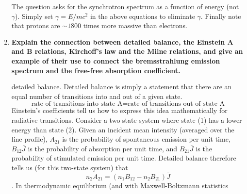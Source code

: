 \begin{enumerate}
      The question asks for the synchrotron spectrum as a function of energy (not $\gamma$).
      Simply set $\gamma = E/mc^2$ in the above equations to eliminate $\gamma$.  Finally note
      that protons are $\sim 1800$ times more massive than electrons.

\item \textbf{Explain the connection between detailed balance, the Einstein A and B relations,
      Kirchoff's law and the Milne relations, and give an example of their use to connect the
      bremsstrahlung emission spectrum and the free-free absorption coefficient.}
      
       detailed balance.  Detailed balance is simply a statement that there are an equal number of transitions
      into and out of a given state.
      \begin{dmath}
        \text{rate of transitions into state A} = \text{rate of transitions out of state A}
      \end{dmath}
      Einstein's coefficients tell us how to express this idea mathematically
      for radiative transitions.
      Consider a two state system where state (1) has a lower energy than state (2).
      Given an incident mean intensity (averaged over the line profile),
      $A_{21}$ is the probability of spontaneous emission per unit time,
      $B_{12}\bar J$ is the probability of absorption per unit time, and
      $B_{21}\bar J$ is the probability of stimulated emission per unit time.
      Detailed balance therefore tells us (for this two-state system) that
      \begin{dmath}\label{eq:detailed_balance}
        n_2A_{21} = (n_1B_{12}-n_2B_{21})\bar J
      \end{dmath}.
      In thermodynamic equilibrium (and with Maxwell-Boltzmann statistics
\end{enumerate}
